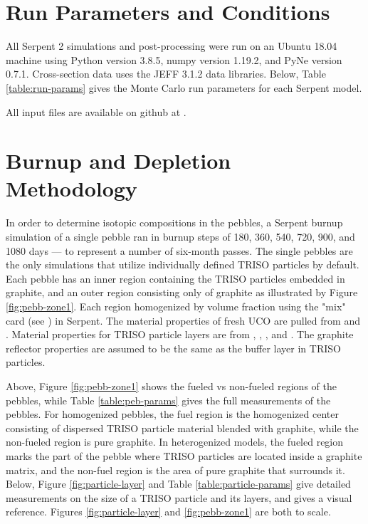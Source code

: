\section{Run Parameters and Conditions}
\label{sec-run-params}

All Serpent 2 simulations and post-processing were run on an Ubuntu 18.04 machine using Python version 3.8.5, numpy version 1.19.2, and PyNe version 0.7.1.  Cross-section data uses the JEFF 3.1.2 data libraries.  Below, Table \ref{table:run-params} gives the Monte Carlo run parameters for each Serpent model.



All input files are available on github at \cite{richter_zoerichterphlox_2021}.

\section{Burnup and Depletion Methodology}
In order to determine isotopic compositions in the pebbles, a Serpent burnup simulation of a single pebble ran in burnup steps of 180, 360, 540, 720, 900, and 1080 days --- to represent a number of six-month passes.  The single pebbles are the only simulations that utilize individually defined TRISO particles by default.  Each pebble has an inner region containing the TRISO particles embedded in graphite, and an outer region consisting only of graphite as illustrated by Figure \ref{fig:pebb-zone1}.  Each region homogenized by volume fraction using the "mix" card (see \cite{leppanenjaakko_serpent_2015}) in Serpent.  The material properties of fresh UCO are pulled from \cite{helmreich_year_2017} and \cite{nagley_fabrication_2010}.  Material properties for TRISO particle layers are from \cite{accuratus_silicon_2013}, \cite{espi_metals_graphite-pyrolytic_2019}, \cite{ho_graphite_1988}, and \cite{johnson_properties_1976}.  The graphite reflector properties are assumed to be the same as the buffer layer in TRISO particles.



Above, Figure \ref{fig:pebb-zone1} shows the fueled vs non-fueled regions of the pebbles, while Table \ref{table:peb-params} gives the full measurements of the pebbles.  For homogenized pebbles, the fuel region is the homogenized center consisting of dispersed TRISO particle material blended with graphite, while the non-fueled region is pure graphite.  In heterogenized models, the fueled region marks the part of the pebble where TRISO particles are located inside a graphite matrix, and the non-fuel region is the area of pure graphite that surrounds it.  Below, Figure \ref{fig:particle-layer} and Table \ref{table:particle-params} give detailed measurements on the size of a TRISO particle and its layers, and gives a visual reference.  Figures \ref{fig:particle-layer} and \ref{fig:pebb-zone1} are both to scale.

